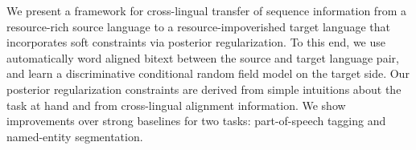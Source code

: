 \documentclass[twoside,makeidx]{book}
\renewcommand{\small}{\fontsize{7}{8}\selectfont}
\begin{document}
\nopagebreak%
\noindent%
{\small We present a framework for cross-lingual transfer of sequence information from a resource-rich source language to a resource-impoverished target language that incorporates soft constraints via posterior regularization. To this end, we use automatically word aligned bitext between the source and target language pair, and learn a discriminative conditional random field model on the target side. Our posterior regularization constraints are derived from simple intuitions about the task at hand and from cross-lingual alignment information. We show improvements over strong baselines for two tasks: part-of-speech tagging and named-entity segmentation.}
\clearpage
\end{document}

